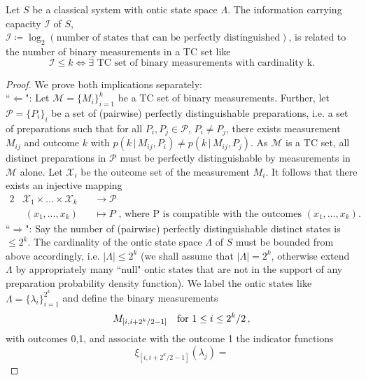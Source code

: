 \begin{lemma}
Let $S$ be a classical system with ontic state space $\Lambda$. The information carrying capacity $\mathcal{I}$ of $S$, $\mathcal{I}\coloneqq\log_2(\text{number of states that can be perfectly distinguished})$, is related to the number of binary measurements in a TC set like
\begin{equation*}
\mathcal{I}\leq k \iff \exists \text{ TC set of binary measurements with cardinality k}.
\end{equation*}
\end{lemma}
\begin{proof}
We prove both implications separately:\\
``$\Longleftarrow$": Let $\mathcal{M}=\{M_i\}_{i=1}^k$ be a TC set of binary measurements. Further, let $\mathcal{P}=\{P_i\}_i$ be a set of (pairwise) perfectly distinguishable preparations, i.e. a set of preparations such that for all $P_i, P_j\in\mathcal{P}$, $P_i\neq P_j$, there exists  measurement $M_{ij}$ and outcome $k$ with $p(k\,\vert\, M_{ij},P_i)\neq p(k\,\vert\, M_{ij},P_j)$. As $\mathcal{M}$ is a TC set, all distinct preparations in $\mathcal{P}$ must be perfectly distinguishable by measurements in $\mathcal{M}$ alone. Let $\mathcal{X}_i$ be the outcome set of the measurement $M_i$. It follows that there exists an injective mapping
\begin{alignat*}{2}
& \mathcal{X}_1\times\dots\times\mathcal{X}_k && \rightarrow \mathcal{P}\\
&\;(x_1,\dots,x_k)&&\mapsto P \text{ , where P is compatible with the outcomes } (x_1,\dots,x_k).
\end{alignat*}
``$\Longrightarrow$": Say the number of (pairwise) perfectly distinguishable distinct states is $\leq 2^k$. The cardinality of the ontic state space $\Lambda$ of $S$ must be bounded from above accordingly, i.e. $\vert \Lambda \vert\leq 2^k$ (we shall assume that $\vert \Lambda \vert = 2^k$, otherwise extend $\Lambda$ by appropriately many ``null" ontic states that are not in the support of any preparation probability density function). We label the ontic states like $\Lambda = \{\lambda_i\}_{i=1}^{2^k}$ and define the binary measurements 
\begin{equation*}
M_{[i,i+2^k/2-1]} \hspace*{1em} \text{for } 1\leq i \leq 2^k/2\,,
\end{equation*}
with outcomes 0,1, and associate with the outcome 1 the indicator functions
\begin{equation*}
\xi_{[i,i+2^k/2-1]}(\lambda_j)=

\end{equation*}
\end{proof}
